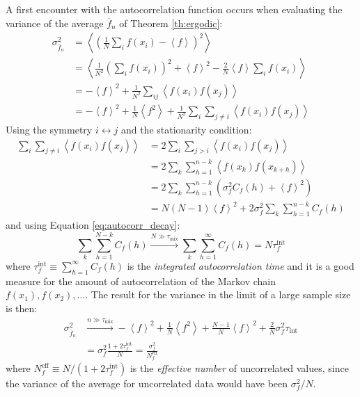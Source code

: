 A first encounter with the autocorrelation function occurs when evaluating the variance of the average $\overline f_n$ of Theorem \ref{th:ergodic}:
\begin{align*}
    \sigma_{\overline f_n}^2 &= \left<\left(\frac{1}{N}\sum_if(x_i) - \left<f\right>\right)^2\right> \\
                             &= \left<\frac{1}{N^2}\left(\sum_if(x_i)\right)^2 +\left<f\right>^2 -\frac{2}{N}\left<f\right>\sum_if(x_i)\right> \\
                             &= -\left<f\right>^2 + \frac{1}{N^2}\sum_{ij}\left<f(x_i)f(x_j)\right> \\
                             &= -\left<f\right>^2 + \frac{1}{N}\left<f^2\right> + \frac{1}{N^2}\sum_i\sum_{j \neq i}\left<f(x_i)f(x_j)\right>
\end{align*}
Using the symmetry $i \leftrightarrow j$ and the stationarity condition:
\begin{align*}
    \sum_i\sum_{j\neq i}\left<f(x_i)f(x_j)\right> &= 2\sum_i\sum_{j>i}\left<f(x_i)f(x_j)\right> \\
                                                  &= 2\sum_k\sum_{h=1}^{n-k}\left<f(x_k)f(x_{k+h})\right> \\
                                                  &= 2\sum_k\sum_{h=1}^{n-k}\left(\sigma_f^2C_f(h)+\left<f\right>^2\right) \\
                                                  &= N(N-1)\left<f\right>^2 + 2\sigma_f^2\sum_k\sum_{h=1}^{n-k}C_f(h)
\end{align*}
and using Equation \eqref{eq:autocorr_decay}:
\[
    \sum_k\sum_{h=1}^{N-k}C_f(h) \xrightarrow{N\gg\tau_\mathrm{mix}} \sum_k\sum_{h=1}^\infty C_f(h) = N\tau_f^\mathrm{int}
\]
where $\tau_f^\mathrm{int} \equiv \sum_{h=1}^\infty C_f(h)$ is the \emph{integrated autocorrelation time} and
it is a good measure for the amount of autocorrelation of the Markov chain $f(x_1), f(x_2), \ldots$.
The result for the variance in the limit of a large sample size is then:
\begin{equation}\label{eq:variance}\begin{aligned}
    \sigma_{\overline f_n}^2 &\xrightarrow{n\gg\tau_\mathrm{mix}}-\left<f\right>^2+\frac{1}{N}\left<f^2\right>+\frac{N-1}{N}\left<f\right>^2+\frac{2}{N}\sigma_f^2\tau_\mathrm{int} \\
                             &= \sigma_f^2\frac{1+2\tau_f^\mathrm{int}}{N} = \frac{\sigma_f^2}{N_f^\mathrm{eff}}
\end{aligned}\end{equation}
where $N_f^\mathrm{eff} \equiv N/(1+2\tau_f^\mathrm{int})$ is the \emph{effective number} of uncorrelated values,
since the variance of the average for uncorrelated data would have been $\sigma_f^2/N$.

